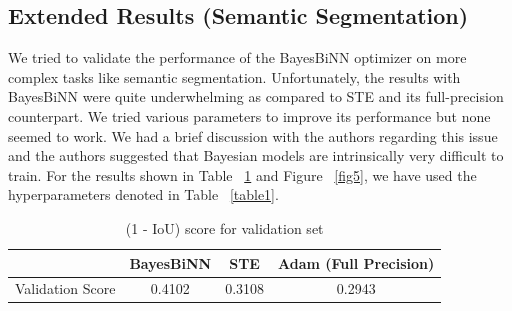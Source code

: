 \subsection{Extended Results (Semantic Segmentation)}
We tried to validate the performance of the BayesBiNN optimizer on more complex tasks like semantic segmentation. Unfortunately, the results with BayesBiNN were quite underwhelming as compared to STE and its full-precision counterpart. We tried various parameters to improve its performance but none seemed to work. We had a brief discussion with the authors regarding this issue and the authors suggested that Bayesian models are intrinsically very difficult to train. For the results shown in Table ~\ref{table5} and Figure ~\ref{fig5}, we have used the hyperparameters denoted in Table ~\ref{table1}.

\begin{table}[h]
\begin{center}
\renewcommand{\arraystretch}{1.1}
\begin{tabular}{ | c | c | c | c |}
\hline
  & BayesBiNN & STE &  Adam (Full Precision) \\ \hline
    Validation Score & 0.4102 & 0.3108 & 0.2943 \\ \hline
\end{tabular}
\caption{(1 - IoU) score for validation set}
\label{table5}
\end{center}
\end{table}




